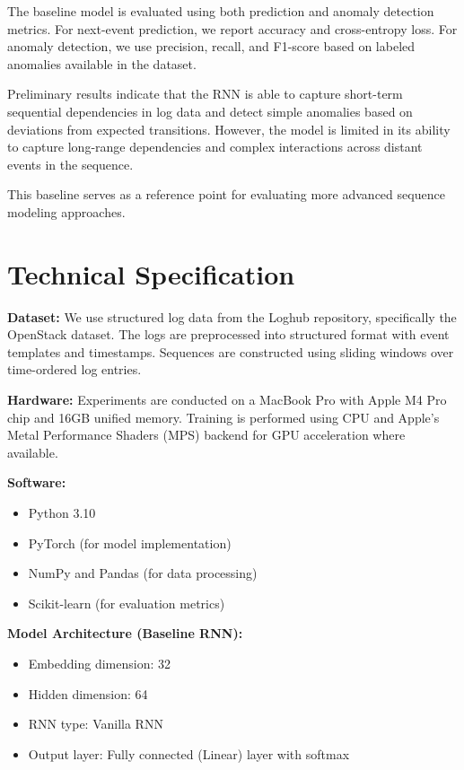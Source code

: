 \documentclass[12pt]{article}
\begin{document}
The baseline model is evaluated using both prediction and anomaly detection metrics. For next-event prediction, we report accuracy and cross-entropy loss. For anomaly detection, we use precision, recall, and F1-score based on labeled anomalies available in the dataset.

Preliminary results indicate that the RNN is able to capture short-term sequential dependencies in log data and detect simple anomalies based on deviations from expected transitions. However, the model is limited in its ability to capture long-range dependencies and complex interactions across distant events in the sequence.

This baseline serves as a reference point for evaluating more advanced sequence modeling approaches.

\section{Technical Specification}

\textbf{Dataset:}
We use structured log data from the Loghub repository, specifically the OpenStack dataset. The logs are preprocessed into structured format with event templates and timestamps. Sequences are constructed using sliding windows over time-ordered log entries.

\textbf{Hardware:}
Experiments are conducted on a MacBook Pro with Apple M4 Pro chip and 16GB unified memory. Training is performed using CPU and Apple’s Metal Performance Shaders (MPS) backend for GPU acceleration where available.

\textbf{Software:}
\begin{itemize}
    \item Python 3.10
    \item PyTorch (for model implementation)
    \item NumPy and Pandas (for data processing)
    \item Scikit-learn (for evaluation metrics)
\end{itemize}

\textbf{Model Architecture (Baseline RNN):}
\begin{itemize}
    \item Embedding dimension: 32
    \item Hidden dimension: 64
    \item RNN type: Vanilla RNN
    \item Output layer: Fully connected (Linear) layer with softmax
\end{itemize}
\end{document}
